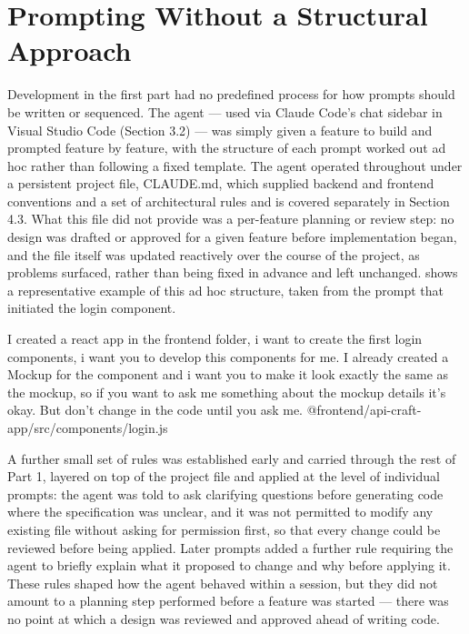\section{Prompting Without a Structural Approach}

Development in the first part had no predefined process for how prompts should be written or sequenced. The agent --- used via Claude Code's chat sidebar in Visual Studio Code (Section 3.2) --- was simply given a feature to build and prompted feature by feature, with the structure of each prompt worked out ad hoc rather than following a fixed template. The agent operated throughout under a persistent project file, CLAUDE.md, which supplied backend and frontend conventions and a set of architectural rules and is covered separately in Section 4.3. What this file did not provide was a per-feature planning or review step: no design was drafted or approved for a given feature before implementation began, and the file itself was updated reactively over the course of the project, as problems surfaced, rather than being fixed in advance and left unchanged.  shows a representative example of this ad hoc structure, taken from the prompt that initiated the login component.

\begin{listing}[H]
\begin{center}
\begin{promptbox}
I created a react app in the frontend folder, i want to create the first login components, i want you to develop this components for me. I already created a Mockup for the component and i want you to make it look exactly the same as the mockup, so if you want to ask me something about the mockup details it's okay. But don't change in the code until you ask me.
@frontend/api-craft-app/src/components/login.js
\end{promptbox}
\end{center}
\caption{Example prompt used to initiate development of the login component.}
\label{lst:login-prompt}
\end{listing}

A further small set of rules was established early and carried through the rest of Part 1, layered on top of the project file and applied at the level of individual prompts: the agent was told to ask clarifying questions before generating code where the specification was unclear, and it was not permitted to modify any existing file without asking for permission first, so that every change could be reviewed before being applied. Later prompts added a further rule requiring the agent to briefly explain what it proposed to change and why before applying it. These rules shaped how the agent behaved within a session, but they did not amount to a planning step performed before a feature was started --- there was no point at which a design was reviewed and approved ahead of writing code.

